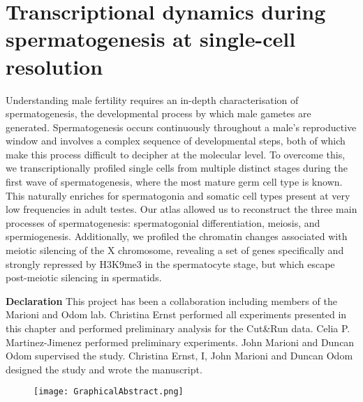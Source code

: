 
\chapter{Transcriptional dynamics during spermatogenesis at single-cell resolution}  

\graphicspath{{Chapter3/Figures/}}

\begin{Abstract}
Understanding male fertility requires an in-depth characterisation of spermatogenesis, the developmental process by which male gametes are generated. Spermatogenesis occurs continuously throughout a male’s reproductive window and involves a complex sequence of developmental steps, both of which make this process difficult to decipher at the molecular level. To overcome this, we transcriptionally profiled single cells from multiple distinct stages during the first wave of spermatogenesis, where the most mature germ cell type is known. This naturally enriches for spermatogonia and somatic cell types present at very low frequencies in adult testes. Our atlas allowed us to reconstruct the three main processes of spermatogenesis: spermatogonial differentiation, meiosis, and spermiogenesis. Additionally, we profiled the chromatin changes associated with meiotic silencing of the X chromosome, revealing a set of genes specifically and strongly repressed by H3K9me3 in the spermatocyte stage, but which escape post-meiotic silencing in spermatids.
\end{Abstract}

\newpage

\begin{Comment}
\textbf{Declaration} This project has been a collaboration including members of the Marioni and Odom lab. Christina Ernst performed all experiments presented in this chapter and performed preliminary analysis for the Cut\&Run data. Celia P. Martinez-Jimenez performed preliminary experiments. John Marioni and Duncan Odom supervised the study. Christina Ernst, I, John Marioni and Duncan Odom designed the study and wrote the manuscript. 
\end{Comment}

\begin{figure}[hb]
\centering    
\texttt{[image: GraphicalAbstract.png]}
\caption*{}
\end{figure}


\newpage


\newpage
%


